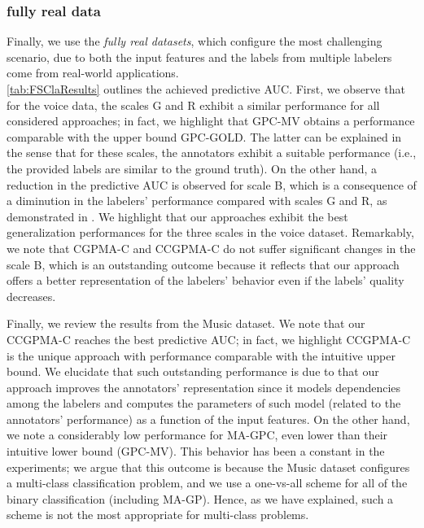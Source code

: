 \documentclass[journal]{IEEEtran}
\begin{document}
\subsubsection{fully real data}
Finally, we use the \emph{fully real datasets}, which configure the most challenging scenario, due to both the input features and the labels from multiple labelers come from real-world applications.\\
\cref{tab:FSClaResults} outlines the achieved predictive AUC. First, we observe that for the voice data, the scales G and R exhibit a similar performance for all considered approaches; in fact, we highlight that GPC-MV obtains a performance comparable with the upper bound GPC-GOLD. The latter can be explained in the sense that for these scales, the annotators exhibit a suitable performance (i.e., the provided labels are similar to the ground truth). On the other hand, a reduction in the predictive AUC is observed for scale B, which is a consequence of a diminution in the labelers' performance compared with scales G and R, as demonstrated in \cite{gonzalez2015automatic}. We highlight that our approaches exhibit the best generalization performances for the three scales in the voice dataset. Remarkably, we note that CGPMA-C and CCGPMA-C do not suffer significant changes in the scale B, which is an outstanding outcome because it reflects that our approach offers a better representation of the labelers’ behavior even if the labels' quality decreases.

Finally, we review the results from the Music dataset. We note that our CCGPMA-C reaches the best predictive AUC; in fact, we highlight CCGPMA-C is the unique approach with performance comparable with the intuitive upper bound. We elucidate that such outstanding performance is due to that our approach improves the annotators' representation since it models dependencies among the labelers and computes the parameters of such model (related to the annotators' performance) as a function of the input features. On the other hand, we note a considerably low performance for MA-GPC, even lower than their intuitive lower bound (GPC-MV). This behavior has been a constant in the experiments; we argue that this outcome is because the Music dataset configures a multi-class classification problem, and we use a one-vs-all scheme for all of the binary classification (including MA-GP). Hence, as we have explained, such a scheme is not the most appropriate for multi-class problems.
\end{document}
